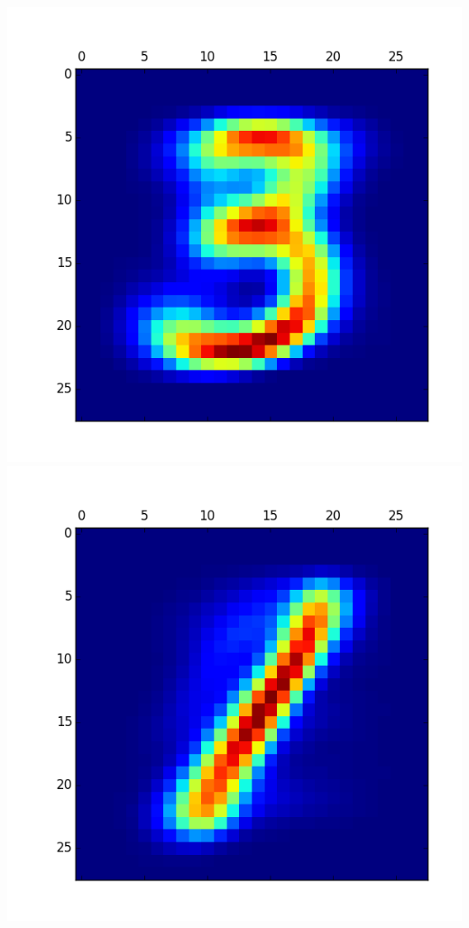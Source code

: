 \documentclass[11pt]{article}
\begin{document}
\begin{itemize}
\includegraphics[scale = 0.5]{30.png}
\includegraphics[scale = 0.5]{31.png}


\end{itemize}
\end{document}
